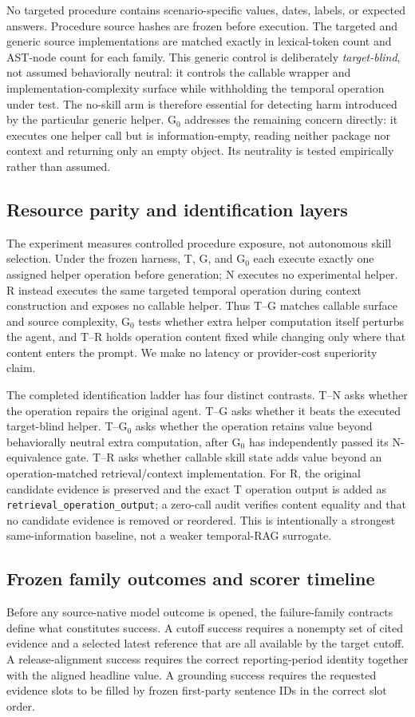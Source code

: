 No targeted procedure contains scenario-specific values, dates, labels, or expected answers. Procedure source hashes are frozen before execution. The targeted and generic source implementations are matched exactly in lexical-token count and AST-node count for each family. This generic control is deliberately \emph{target-blind}, not assumed behaviorally neutral: it controls the callable wrapper and implementation-complexity surface while withholding the temporal operation under test. The no-skill arm is therefore essential for detecting harm introduced by the particular generic helper. G$_0$ addresses the remaining concern directly: it executes one helper call but is information-empty, reading neither package nor context and returning only an empty object. Its neutrality is tested empirically rather than assumed.

\subsection{Resource parity and identification layers}
The experiment measures controlled procedure exposure, not autonomous skill selection. Under the frozen harness, T, G, and G$_0$ each execute exactly one assigned helper operation before generation; N executes no experimental helper. R instead executes the same targeted temporal operation during context construction and exposes no callable helper. Thus T--G matches callable surface and source complexity, G$_0$ tests whether extra helper computation itself perturbs the agent, and T--R holds operation content fixed while changing only where that content enters the prompt. We make no latency or provider-cost superiority claim.

The completed identification ladder has four distinct contrasts. T--N asks whether the operation repairs the original agent. T--G asks whether it beats the executed target-blind helper. T--G$_0$ asks whether the operation retains value beyond behaviorally neutral extra computation, after G$_0$ has independently passed its N-equivalence gate. T--R asks whether callable skill state adds value beyond an operation-matched retrieval/context implementation. For R, the original candidate evidence is preserved and the exact T operation output is added as \texttt{retrieval\_operation\_output}; a zero-call audit verifies content equality and that no candidate evidence is removed or reordered. This is intentionally a strongest same-information baseline, not a weaker temporal-RAG surrogate.

\subsection{Frozen family outcomes and scorer timeline}
Before any source-native model outcome is opened, the failure-family contracts define what constitutes success. A cutoff success requires a nonempty set of cited evidence and a selected latest reference that are all available by the target cutoff. A release-alignment success requires the correct reporting-period identity together with the aligned headline value. A grounding success requires the requested evidence slots to be filled by frozen first-party sentence IDs in the correct slot order.

